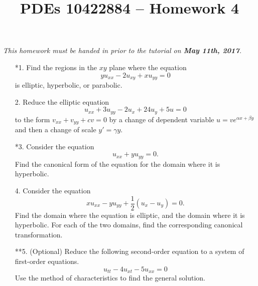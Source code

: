 \documentclass[10pt,a4paper]{article}
\title{PDEs 10422884 -- Homework 4}
\date{}
\begin{document}
\maketitle
\textsl{ This homework must be handed in prior to the tutorial on \textbf{May 11th, 2017}.}

\begin{enumerate}
\item[*1.] Find the regions in the $xy$ plane where the equation 
\[ y u_{xx} - 2 u_{xy} + x u_{yy} = 0 \]
is elliptic, hyperbolic, or parabolic. %
\item[2.] Reduce the elliptic equation
\[ u_{xx} + 3u_{yy} - 2u_x + 24 u_y + 5 u = 0 \]
to the form $v_{xx} + v_{yy} + cv = 0$ by a change of dependent variable $u = ve^{\alpha x + \beta y}$ and then a change of scale $y' = \gamma y.$ %
\item[*3.] Consider the equation 
\[ u_{xx} + y u_{yy} = 0.\]
Find the canonical form of the equation for the domain where it is hyperbolic. %
\item[4.] Consider the equation 
\[ xu_{xx} - yu_{yy} + \frac{1}{2}(u_x - u_y) = 0. \]
Find the domain where the equation is elliptic, and the domain where it is hyperbolic. For each of the two domains, find the corresponding canonical transformation. %
\item[**5.] (Optional) Reduce the following second-order equation to a system of first-order equations.
\[ u_{tt} - 4u_{xt} - 5u_{xx} = 0 \]
Use the method of characteristics to find the general solution. %
\end{enumerate}
\end{document}
